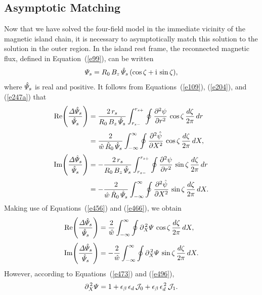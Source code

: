 \documentclass[notitlepage,12pt]{article}
\begin{document}
\subsection{Asymptotic Matching}
Now that we have solved the four-field model in the immediate vicinity of the magnetic island chain, it is
necessary to asymptotically match this solution to the solution in the outer region. 
In the island rest frame, the reconnected magnetic flux, defined in Equation~(\ref{e99}), can be written
\begin{equation}
{\mit\Psi}_s = R_0\,B_z\,\hat{\mit\Psi}_s\,(\cos\zeta + {\rm i}\,\sin\zeta),
\end{equation}
where $\hat{\mit\Psi}_s$ is real and positive. It follows from
Equations~(\ref{e109}), (\ref{e204}), and (\ref{e247a}) that
\begin{align}
{\rm Re}\!\left(\frac{{\mit\Delta}\hat{\mit\Psi}_s}{\hat{\mit\Psi}_s}\right)&= \frac{2\,r_s}{R_0\,B_z\,\hat{\mit\Psi}_s}\int_{r_{s-}}^{r_{s+}}\oint
\frac{\partial^2\psi}{\partial r^2}\,\cos\zeta\,\frac{d\zeta}{2\pi}\,dr\nonumber\\[0.5ex]&=\frac{2}{\hat{w}\,\hat{R}_0\,\hat{\mit\Psi}_s}\int_{-\infty}^{\infty}\oint
\frac{\partial^2\hat{\psi}}{\partial X^2}\,\cos\zeta\,\frac{d\zeta}{2\pi}\,dX,\\[0.5ex]
{\rm Im}\!\left(\frac{{\mit\Delta}\hat{\mit\Psi}_s}{\hat{\mit\Psi}_s}\right)&= -\frac{2\,r_s}{R_0\,B_z\,\hat{\mit\Psi}_s}\int_{r_{s-}}^{r_{s+}}\oint
\frac{\partial^2\psi}{\partial r^2}\,\sin\zeta\,\frac{d\zeta}{2\pi}\,dr\nonumber\\[0.5ex]&=-\frac{2}{\hat{w}\,\hat{R}_0\,\hat{\mit\Psi}_s}\int_{-\infty}^{\infty}\oint
\frac{\partial^2\hat{\psi}}{\partial X^2}\,\sin\zeta\,\frac{d\zeta}{2\pi}\,dX.
\end{align}
Making use of Equations~(\ref{e456}) and (\ref{e466}), we obtain
\begin{align}
{\rm Re}\!\left(\frac{{\mit\Delta}\hat{\mit\Psi}_s}{\hat{\mit\Psi}_s}\right)&=\frac{2}{\hat{w}}\int_{-\infty}^{\infty}\oint
\partial_X^{\,2}{\mit\Psi}\,\cos\zeta\,\frac{d\zeta}{2\pi}\,dX,\\[0.5ex]
{\rm Im}\!\left(\frac{{\mit\Delta}\hat{\mit\Psi}_s}{\hat{\mit\Psi}_s}\right)&=-\frac{2}{\hat{w}}\int_{-\infty}^{\infty}\oint
\partial_X^{\,2}{\mit\Psi}\,\sin\zeta\,\frac{d\zeta}{2\pi}\,dX.
\end{align}
However, according to Equations~(\ref{e473}) and (\ref{e496}),
\begin{equation}
\partial_X^{\,2}{\mit\Psi} = 1 + \epsilon_\beta\,\epsilon_d\,{\cal J}_0 + \epsilon_\beta\,\epsilon_d^{\,2}\,{\cal J}_1.
\end{equation}
\end{document}
